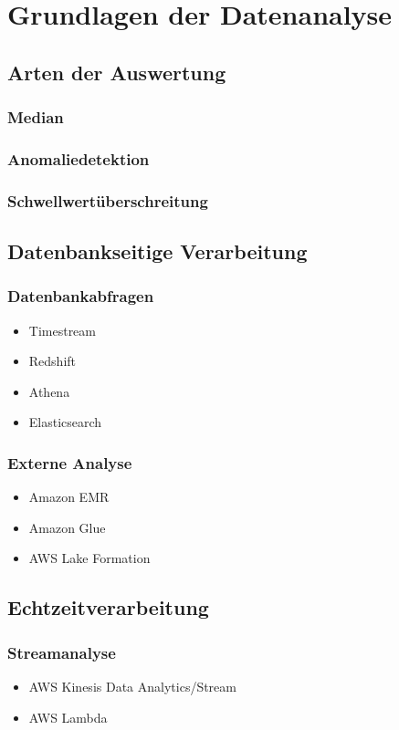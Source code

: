 \section{Grundlagen der Datenanalyse}

\subsection{Arten der Auswertung}
\subsubsection{Median}
\subsubsection{Anomaliedetektion}
\subsubsection{Schwellwertüberschreitung}

\subsection{Datenbankseitige Verarbeitung}
\subsubsection{Datenbankabfragen}
\begin{itemize}
\item Timestream
\item Redshift
\item Athena
\item Elasticsearch
\end{itemize}

\subsubsection{Externe Analyse}
\begin{itemize}
\item Amazon EMR
\item Amazon Glue
\item AWS Lake Formation
\end{itemize}


\subsection{Echtzeitverarbeitung}
\subsubsection{Streamanalyse}
\begin{itemize}
\item AWS Kinesis Data Analytics/Stream
\item AWS Lambda
\end{itemize}

